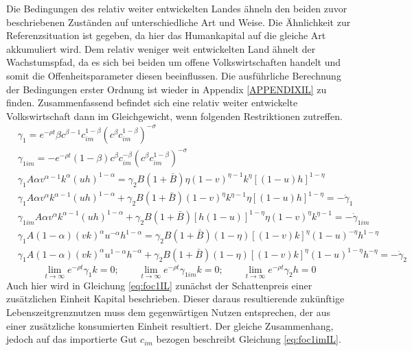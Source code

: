 Die Bedingungen des relativ weiter entwickelten Landes ähneln den beiden zuvor beschriebenen Zuständen auf unterschiedliche Art und Weise. Die Ähnlichkeit zur Referenzsituation ist gegeben, da hier das Humankapital auf die gleiche Art akkumuliert wird. Dem relativ weniger weit entwickelten Land ähnelt der Wachstumspfad, da es sich bei beiden um offene Volkswirtschaften handelt und somit die Offenheitsparameter diesen beeinflussen. Die ausführliche Berechnung der Bedingungen erster Ordnung ist wieder in Appendix \ref{APPENDIXIL} zu finden. Zusammenfassend befindet sich eine relativ weiter entwickelte Volkswirtschaft dann im Gleichgewicht, wenn folgenden Restriktionen zutreffen.
\begin{align}
&\gamma_1=e^{-\rho t}\beta c^{\beta-1}c_{im}^{1-\beta}(c^\beta c_{im}^{1-\beta})^{-\sigma}\label{eq:foc1IL}\\
&\gamma_{1im}=-e^{-\rho t}(1-\beta) c^{\beta}c_{im}^{-\beta}(c^\beta c_{im}^{1-\beta})^{-\sigma}\label{eq:foc1imIL}\\
&\gamma_1A\alpha v^{\alpha-1}k^\alpha(uh)^{1-\alpha}=\gamma_2B(1+\bar{B})\eta(1-v)^{\eta-1}k^\eta[(1-u)h]^{1-\eta}\label{eq:foc2IL}\\
&\gamma_{1}A\alpha v^{\alpha} k^{\alpha -1} (u h)^{1- \alpha} + \gamma_{2}B(1+\bar{B})(1- v)^{\eta} k^{\eta -1} \eta \left [ (1-u)h \right ]^{1- \eta}= - \dot{\gamma}_{1}\label{eq:foc3IL}\\
&\gamma_{1 im}A\alpha v^{\alpha}k^{\alpha -1}(uh)^{1- \alpha}+ \gamma_{2}B(1+\bar{B}) [h(1-u)]^{1- \eta} \eta(1-v)^{\eta}k^{\eta -1}= - \dot{\gamma}_{1im}\label{eq:foc3imIL}\\
&\gamma_1A(1-\alpha)(vk)^{\alpha}u^{-\alpha}h^{1-\alpha}=\gamma_2B(1+\bar{B})(1-\eta)[(1-v)k]^\eta (1-u)^{-\eta} h^{1-\eta}\label{eq:foc4IL}\\
&\gamma_1A(1-\alpha)(vk)^\alpha u^{1-\alpha}h^{-\alpha}+\gamma_2 B(1+\bar{B})(1-\eta)[(1-v)k]^{\eta}(1-u)^{1-\eta}h^{-\eta}=-\dot{\gamma}_2\label{eq:foc5IL}
\end{align}
\vspace{-0.6cm}
\begin{equation}
\lim_{t \to \infty}e^{-\rho t}\gamma_1k=0;\qquad \lim_{t \to \infty}e^{-\rho t}\gamma_{1im}k=0; \qquad \lim_{t \to \infty}e^{-\rho t}\gamma_2h=0
\end{equation}
Auch hier wird in Gleichung \eqref{eq:foc1IL} zunächst der Schattenpreis einer zusätzlichen Einheit Kapital beschrieben. Dieser daraus resultierende zukünftige Lebenszeitgrenznutzen muss dem gegenwärtigen Nutzen entsprechen, der aus einer zusätzliche konsumierten Einheit resultiert. Der gleiche Zusammenhang, jedoch auf das importierte Gut $c_{im}$ bezogen beschreibt Gleichung \eqref{eq:foc1imIL}.\\
